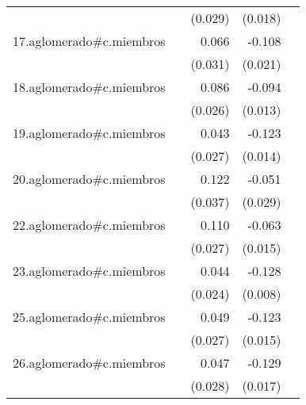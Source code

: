 {\begin{longtable}{l*{4}{D{.}{.}{-1}}}
            &                     &     (0.029)         &     (0.018)         &                     \\
\addlinespace
17.aglomerado#c.miembros&                     &       0.066\sym{*}  &      -0.108\sym{***}&                     \\
            &                     &     (0.031)         &     (0.021)         &                     \\
\addlinespace
18.aglomerado#c.miembros&                     &       0.086\sym{**} &      -0.094\sym{***}&                     \\
            &                     &     (0.026)         &     (0.013)         &                     \\
\addlinespace
19.aglomerado#c.miembros&                     &       0.043         &      -0.123\sym{***}&                     \\
            &                     &     (0.027)         &     (0.014)         &                     \\
\addlinespace
20.aglomerado#c.miembros&                     &       0.122\sym{***}&      -0.051         &                     \\
            &                     &     (0.037)         &     (0.029)         &                     \\
\addlinespace
22.aglomerado#c.miembros&                     &       0.110\sym{***}&      -0.063\sym{***}&                     \\
            &                     &     (0.027)         &     (0.015)         &                     \\
\addlinespace
23.aglomerado#c.miembros&                     &       0.044         &      -0.128\sym{***}&                     \\
            &                     &     (0.024)         &     (0.008)         &                     \\
\addlinespace
25.aglomerado#c.miembros&                     &       0.049         &      -0.123\sym{***}&                     \\
            &                     &     (0.027)         &     (0.015)         &                     \\
\addlinespace
26.aglomerado#c.miembros&                     &       0.047         &      -0.129\sym{***}&                     \\
            &                     &     (0.028)         &     (0.017)         &                     \\

\end{longtable}}
